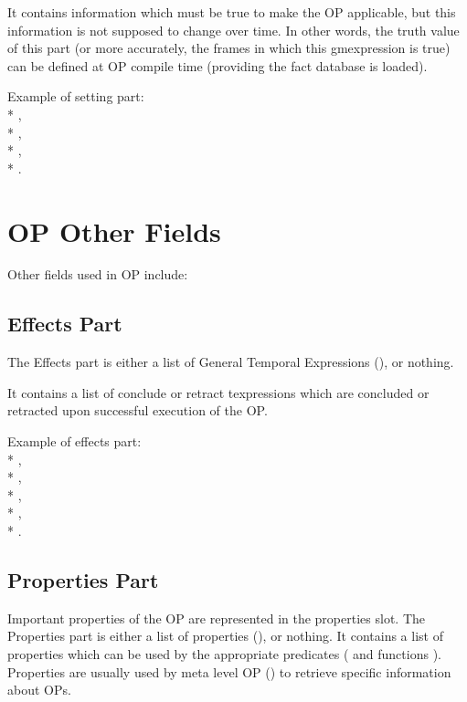 It contains information which must be true to make the OP applicable, but
this information is not supposed to change over time. In other words, the
truth value of this part (or more accurately, the frames in which this
gmexpression is true) can be defined at OP compile time (providing the
fact database is loaded).

Example of setting part: \\*
, \\*
, \\*
, \\*
.

\section{OP Other Fields}

Other fields used in OP include:


\subsection{Effects Part}

The Effects part is either a list of General Temporal Expressions
(), or nothing.

It contains a list of conclude or retract texpressions which are
concluded or retracted upon successful execution of the OP.

Example of effects part: \\*
\code{()}, \\*
, \\*
, \\*
, \\*
.

\subsection{Properties Part}

Important properties of the OP are represented in the properties slot. The
Properties part is either a list of properties (), or
nothing. It contains a list of properties which can be used by the appropriate
predicates ( and functions
). Properties are usually used
by meta level OP () to retrieve specific information about OPs.

